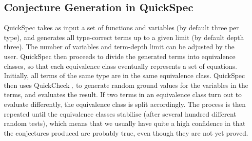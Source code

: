 \subsection{Conjecture Generation in QuickSpec}
QuickSpec takes as input a set of functions and variables (by default three per type), and generates all type-correct terms up to a given limit (by default depth three).
%
The number of variables and term-depth limit can be adjusted by the user.
%
QuickSpec then proceeds to divide the generated terms into equivalence classes, so that each equivalence class eventually represents a set of equations.
%
Initially, all terms of the same type are in the same equivalence class. QuickSpec then uses QuickCheck \cite{quickcheck}, to generate random ground values for the variables in the terms, and evaluates the result.
%
If two terms in an equivalence class turn out to evaluate differently, the equivalence class is split accordingly.
%
The process is then repeated until the equivalence classes stabilise (after several hundred different random tests), which means that we usually have quite a high confidence in that the conjectures produced are probably true, even though they are not yet proved.  


